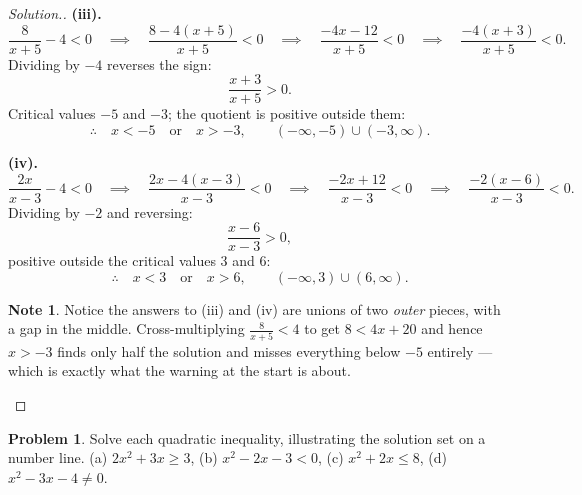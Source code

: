 \documentclass[11pt,a4paper]{article}
\theoremstyle{definition}
\newtheorem{note}[thm]{Note}
\newtheorem{problemx}{Problem}[section]
\newenvironment{problem}{\begin{problemx}}{\end{problemx}}
\newenvironment{solution}
  {\renewcommand{\qedsymbol}{}\begin{proof}[\textit{Solution}.]}
  {\end{proof}}
\begin{document}
\begin{solution}
\textbf{(iii).}
$$\frac{8}{x+5}-4<0\quad\implies\quad \frac{8-4(x+5)}{x+5}<0
\quad\implies\quad \frac{-4x-12}{x+5}<0\quad\implies\quad \frac{-4(x+3)}{x+5}<0.$$
Dividing by $-4$ reverses the sign:
$$\frac{x+3}{x+5}>0.$$
Critical values $-5$ and $-3$; the quotient is positive outside them:
$$\therefore\quad x<-5\quad\text{or}\quad x>-3,\qquad
(-\infty,-5)\cup(-3,\infty).$$

\textbf{(iv).}
$$\frac{2x}{x-3}-4<0\quad\implies\quad \frac{2x-4(x-3)}{x-3}<0
\quad\implies\quad \frac{-2x+12}{x-3}<0\quad\implies\quad \frac{-2(x-6)}{x-3}<0.$$
Dividing by $-2$ and reversing:
$$\frac{x-6}{x-3}>0,$$
positive outside the critical values $3$ and $6$:
$$\therefore\quad x<3\quad\text{or}\quad x>6,\qquad (-\infty,3)\cup(6,\infty).$$

\begin{note}
Notice the answers to (iii) and (iv) are unions of two \emph{outer} pieces, with a gap
in the middle. Cross-multiplying $\frac{8}{x+5}<4$ to get $8<4x+20$ and hence
$x>-3$ finds only half the solution and misses everything below $-5$ entirely --- which
is exactly what the warning at the start is about.
\end{note}
\end{solution}

\begin{problem}
Solve each quadratic inequality, illustrating the solution set on a number line.
\quad (a) $2x^2+3x\geq 3$, \quad (b) $x^2-2x-3<0$, \quad (c) $x^2+2x\leq 8$, \quad
(d) $x^2-3x-4\neq 0$.
\end{problem}
\end{document}
